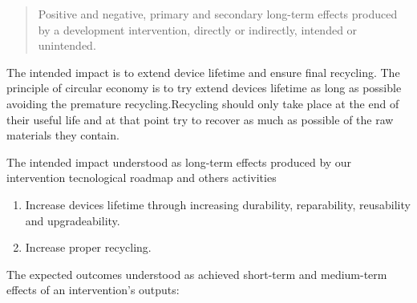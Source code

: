 \documentclass[
]{book}
\providecommand{\tightlist}{%
  \setlength{\itemsep}{0pt}\setlength{\parskip}{0pt}}
\begin{document}
\begin{quote}
Positive and negative, primary and secondary long-term effects produced by a development intervention, directly or indirectly, intended or unintended.
\end{quote}

The intended impact is to extend device lifetime and ensure final recycling. The principle of circular economy is to try extend devices lifetime as long as possible avoiding the premature recycling.Recycling should only take place at the end of their useful life and at that point try to recover as much as possible of the raw materials they contain.

The intended impact understood as long-term effects produced by our intervention tecnological roadmap and others activities

\begin{enumerate}
\def\labelenumi{\arabic{enumi}.}
\tightlist
\item
  Increase devices lifetime through increasing durability, reparability, reusability and upgradeability.
\item
  Increase proper recycling.
\end{enumerate}

The expected outcomes understood as achieved short-term and medium-term effects of an intervention's outputs:
\end{document}
